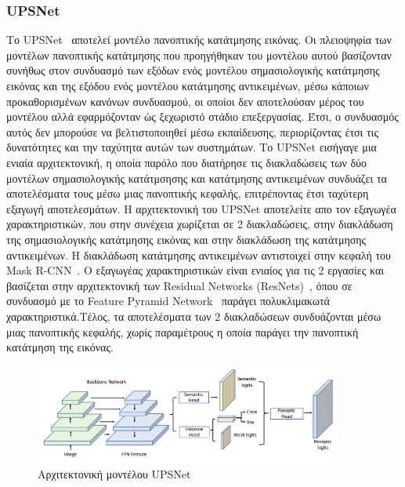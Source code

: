 \documentclass[12pt]{article}
\numberwithin{equation}{section}
\begin{document}
\subsubsection{UPSNet}

Το UPSNet~\cite{xiong2019upsnetunifiedpanopticsegmentation} αποτελεί μοντέλο πανοπτικής κατάτμησης εικόνας. Οι πλειοψηφία των μοντέλων πανοπτικής κατάτμησης που προηγήθηκαν του μοντέλου αυτού βασίζονταν συνήθως στον συνδυασμό των εξόδων ενός μοντέλου σημασιολογικής κατάτμησης εικόνας και της εξόδου ενός μοντέλου κατάτμησης αντικειμένων, μέσω κάποιων προκαθορισμένων κανόνων συνδυασμού, οι οποίοι δεν αποτελούσαν μέρος του μοντέλου αλλά εφαρμόζονταν ώς ξεχωριστό στάδιο επεξεργασίας. Έτσι, ο συνδυασμός αυτός δεν μπορούσε να βελτιστοποιηθεί μέσω εκπαίδευσης, περιορίζοντας έτσι τις δυνατότητες και την ταχύτητα αυτών των συστημάτων. Το UPSNet εισήγαγε μια ενιαία αρχιτεκτονική, η οποία παρόλο που διατήρησε τις διακλαδώσεις των δύο μοντέλων σημασιολογικής κατάτμσησης και κατάτμησης αντικειμένων συνδυάζει τα αποτελέσματα τους μέσω μιας πανοπτικής κεφαλής, επιτρέποντας έτσι ταχύτερη εξαγωγή αποτελεσμάτων. Η αρχιτεκτονική του UPSNet αποτελείτε απο τον εξαγωγέα χαρακτηριστικών, που στην συνέχεια χωρίζεται σε 2 διακλαδώσεις, στην διακλάδωση της σημασιολογικής κατάτμησης εικόνας και στην διακλάδωση της κατάτμησης αντικειμένων. Η διακλάδωση κατάτμησης αντικειμένων αντιστοιχεί στην κεφαλή του Mask R-CNN~\cite{he2018maskrcnn}. Ο εξαγωγέας χαρακτηριστικών είναι ενιαίος για τις 2 εργασίες και βασίζεται στην αρχιτεκτονική των Residual Networks (ResNets)~\cite{he2015deepresiduallearningimage}, όπου σε συνδυασμό με το Feature Pyramid Network~\cite{lin2017featurepyramidnetworksobject} παράγει πολυκλιμακωτά χαρακτηριστικά.Τέλος, τα αποτελέσματα των 2 διακλαδώσεων συνδυάζονται μέσω μιας πανοπτικής κεφαλής, χωρίς παραμέτρους η οποία παράγει την πανοπτική κατάτμηση της εικόνας.  \\

\begin{figure}[h!]
  \centering
  \includegraphics[width=0.9\textwidth]{images/UPSNet.png} %
  \caption{Αρχιτεκτονική μοντέλου UPSNet}
  \label{figure 20}
\end{figure} 
\end{document}
